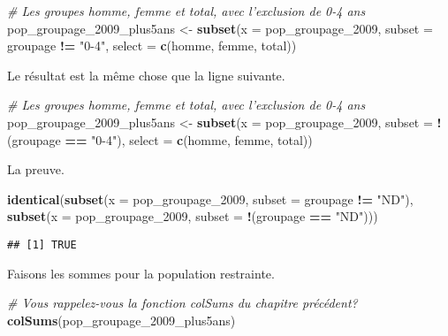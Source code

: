 \documentclass[]{book}
\newenvironment{Shaded}{\begin{snugshade}}{\end{snugshade}}
\newcommand{\KeywordTok}[1]{\textcolor[rgb]{0.13,0.29,0.53}{\textbf{#1}}}
\newcommand{\DataTypeTok}[1]{\textcolor[rgb]{0.13,0.29,0.53}{#1}}
\newcommand{\DecValTok}[1]{\textcolor[rgb]{0.00,0.00,0.81}{#1}}
\newcommand{\StringTok}[1]{\textcolor[rgb]{0.31,0.60,0.02}{#1}}
\newcommand{\CommentTok}[1]{\textcolor[rgb]{0.56,0.35,0.01}{\textit{#1}}}
\newcommand{\OperatorTok}[1]{\textcolor[rgb]{0.81,0.36,0.00}{\textbf{#1}}}
\newcommand{\NormalTok}[1]{#1}
\begin{document}
\begin{Shaded}
\begin{Highlighting}[]
\CommentTok{# Les groupes homme, femme et total, avec l'exclusion de 0-4 ans}
\NormalTok{pop_groupage_2009_plus5ans <-}\StringTok{ }\KeywordTok{subset}\NormalTok{(}\DataTypeTok{x =}\NormalTok{ pop_groupage_}\DecValTok{2009}\NormalTok{, }\DataTypeTok{subset =}\NormalTok{ groupage }\OperatorTok{!=}\StringTok{ "0-4"}\NormalTok{, }\DataTypeTok{select =} \KeywordTok{c}\NormalTok{(homme, femme, total))}
\end{Highlighting}
\end{Shaded}

Le résultat est la même chose que la ligne suivante.

\begin{Shaded}
\begin{Highlighting}[]
\CommentTok{# Les groupes homme, femme et total, avec l'exclusion de 0-4 ans}
\NormalTok{pop_groupage_2009_plus5ans <-}\StringTok{ }\KeywordTok{subset}\NormalTok{(}\DataTypeTok{x =}\NormalTok{ pop_groupage_}\DecValTok{2009}\NormalTok{, }\DataTypeTok{subset =} \OperatorTok{!}\NormalTok{(groupage }\OperatorTok{==}\StringTok{ "0-4"}\NormalTok{), }\DataTypeTok{select =} \KeywordTok{c}\NormalTok{(homme, femme, total))}
\end{Highlighting}
\end{Shaded}

La preuve.

\begin{Shaded}
\begin{Highlighting}[]
\KeywordTok{identical}\NormalTok{(}\KeywordTok{subset}\NormalTok{(}\DataTypeTok{x =}\NormalTok{ pop_groupage_}\DecValTok{2009}\NormalTok{, }\DataTypeTok{subset =}\NormalTok{ groupage }\OperatorTok{!=}\StringTok{ "ND"}\NormalTok{),}
          \KeywordTok{subset}\NormalTok{(}\DataTypeTok{x =}\NormalTok{ pop_groupage_}\DecValTok{2009}\NormalTok{, }\DataTypeTok{subset =} \OperatorTok{!}\NormalTok{(groupage }\OperatorTok{==}\StringTok{ "ND"}\NormalTok{)))}
\end{Highlighting}
\end{Shaded}

\begin{verbatim}
## [1] TRUE
\end{verbatim}

Faisons les sommes pour la population restrainte.

\begin{Shaded}
\begin{Highlighting}[]
\CommentTok{# Vous rappelez-vous la fonction colSums du chapitre précédent?}
\KeywordTok{colSums}\NormalTok{(pop_groupage_2009_plus5ans)}
\end{Highlighting}
\end{Shaded}
\end{document}
